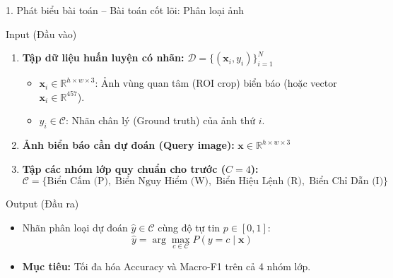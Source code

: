 \documentclass[aspectratio=169, 10pt]{beamer}
\begin{document}
\begin{frame}{1. Phát biểu bài toán -- Bài toán cốt lõi: Phân loại ảnh}
  \begin{block}{Input (Đầu vào)}
    \begin{enumerate}
      \item \textbf{Tập dữ liệu huấn luyện có nhãn:} $\mathcal{D} = \{(\mathbf{x}_i, y_i)\}_{i=1}^{N}$
      \begin{itemize}
        \item $\mathbf{x}_i \in \mathbb{R}^{h \times w \times 3}$: Ảnh vùng quan tâm (ROI crop) biển báo (hoặc vector $\mathbf{x}_i \in \mathbb{R}^{457}$).
        \item $y_i \in \mathcal{C}$: Nhãn chân lý (Ground truth) của ảnh thứ $i$.
      \end{itemize}
      \item \textbf{Ảnh biển báo cần dự đoán (Query image):} $\mathbf{x} \in \mathbb{R}^{h \times w \times 3}$
      \item \textbf{Tập các nhóm lớp quy chuẩn cho trước ($C = 4$):}
      $$\mathcal{C} = \{\text{Biển Cấm (P)}, \; \text{Biển Nguy Hiểm (W)}, \; \text{Biển Hiệu Lệnh (R)}, \; \text{Biển Chỉ Dẫn (I)}\}$$
    \end{enumerate}
  \end{block}

  \begin{exampleblock}{Output (Đầu ra)}
    \begin{itemize}
      \item Nhãn phân loại dự đoán $\hat{y} \in \mathcal{C}$ cùng độ tự tin $p \in [0, 1]$:
      $$\hat{y} = \arg\max_{c \in \mathcal{C}} P(y = c \mid \mathbf{x})$$
      \item \textbf{Mục tiêu:} Tối đa hóa Accuracy và Macro-F1 trên cả 4 nhóm lớp.
    \end{itemize}
  \end{exampleblock}
\end{frame}
\end{document}
